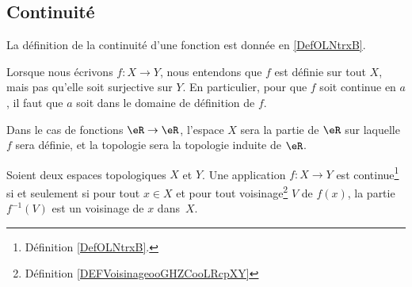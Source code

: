 \subsection{Continuité}

La définition de la continuité d'une fonction est donnée en \ref{DefOLNtrxB}.

\begin{normaltext}
	Lorsque nous écrivons \( f\colon X\to Y\), nous entendons que \( f\) est définie sur tout \( X\), mais pas qu'elle soit surjective sur \( Y\). En particulier, pour que \( f\) soit continue en \( a\), il faut que \( a\) soit dans le domaine de définition de \( f\).

	Dans le cas de fonctions \( \eR\to \eR\), l'espace \( X\) sera la partie de \( \eR\) sur laquelle \( f\) sera définie, et la topologie sera la topologie induite de \( \eR\).
\end{normaltext}

\begin{proposition}       \label{PROPooOXBCooIzLaPe}
	Soient deux espaces topologiques \( X\) et \( Y\). Une application \( f\colon X\to Y\) est continue\footnote{Définition \ref{DefOLNtrxB}.} si et seulement si pour tout \( x\in X\) et pour tout voisinage\footnote{Définition \ref{DEFVoisinageooGHZCooLRcpXY}} \( V\) de \( f(x)\), la partie \( f^{-1}(V)\) est un voisinage de \( x\) dans~\( X\).
\end{proposition}

